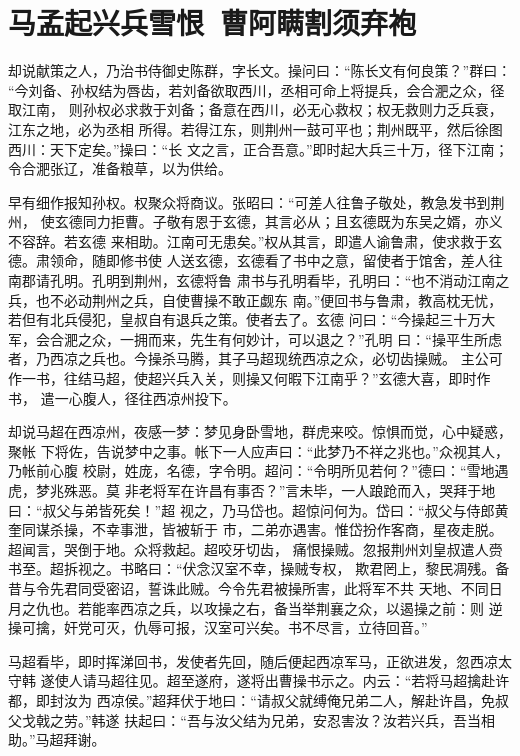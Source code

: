 \chapter{马孟起兴兵雪恨~曹阿瞒割须弃袍}

却说献策之人，乃治书侍御史陈群，字长文。操问曰：“陈长文有何良策？”群曰：
“今刘备、孙权结为唇齿，若刘备欲取西川，丞相可命上将提兵，会合淝之众，径取江南，
则孙权必求救于刘备；备意在西川，必无心救权；权无救则力乏兵衰，江东之地，必为丞相
所得。若得江东，则荆州一鼓可平也；荆州既平，然后徐图西川：天下定矣。”操曰：“长
文之言，正合吾意。”即时起大兵三十万，径下江南；令合淝张辽，准备粮草，以为供给。

早有细作报知孙权。权聚众将商议。张昭曰：“可差人往鲁子敬处，教急发书到荆州，
使玄德同力拒曹。子敬有恩于玄德，其言必从；且玄德既为东吴之婿，亦义不容辞。若玄德
来相助。江南可无患矣。”权从其言，即遣人谕鲁肃，使求救于玄德。肃领命，随即修书使
人送玄德，玄德看了书中之意，留使者于馆舍，差人往南郡请孔明。孔明到荆州，玄德将鲁
肃书与孔明看毕，孔明曰：“也不消动江南之兵，也不必动荆州之兵，自使曹操不敢正觑东
南。”便回书与鲁肃，教高枕无忧，若但有北兵侵犯，皇叔自有退兵之策。使者去了。玄德
问曰：“今操起三十万大军，会合淝之众，一拥而来，先生有何妙计，可以退之？”孔明
曰：“操平生所虑者，乃西凉之兵也。今操杀马腾，其子马超现统西凉之众，必切齿操贼。
主公可作一书，往结马超，使超兴兵入关，则操又何暇下江南乎？”玄德大喜，即时作书，
遣一心腹人，径往西凉州投下。

却说马超在西凉州，夜感一梦：梦见身卧雪地，群虎来咬。惊惧而觉，心中疑惑，聚帐
下将佐，告说梦中之事。帐下一人应声曰：“此梦乃不祥之兆也。”众视其人，乃帐前心腹
校尉，姓庞，名德，字令明。超问：“令明所见若何？”德曰：“雪地遇虎，梦兆殊恶。莫
非老将军在许昌有事否？”言未毕，一人踉跄而入，哭拜于地曰：“叔父与弟皆死矣！”超
视之，乃马岱也。超惊问何为。岱曰：“叔父与侍郎黄奎同谋杀操，不幸事泄，皆被斩于
市，二弟亦遇害。惟岱扮作客商，星夜走脱。超闻言，哭倒于地。众将救起。超咬牙切齿，
痛恨操贼。忽报荆州刘皇叔遣人赍书至。超拆视之。书略曰：“伏念汉室不幸，操贼专权，
欺君罔上，黎民凋残。备昔与令先君同受密诏，誓诛此贼。今令先君被操所害，此将军不共
天地、不同日月之仇也。若能率西凉之兵，以攻操之右，备当举荆襄之众，以遏操之前：则
逆操可擒，奸党可灭，仇辱可报，汉室可兴矣。书不尽言，立待回音。”

马超看毕，即时挥涕回书，发使者先回，随后便起西凉军马，正欲进发，忽西凉太守韩
遂使人请马超往见。超至遂府，遂将出曹操书示之。内云：“若将马超擒赴许都，即封汝为
西凉侯。”超拜伏于地曰：“请叔父就缚俺兄弟二人，解赴许昌，免叔父戈戟之劳。”韩遂
扶起曰：“吾与汝父结为兄弟，安忍害汝？汝若兴兵，吾当相助。”马超拜谢。

